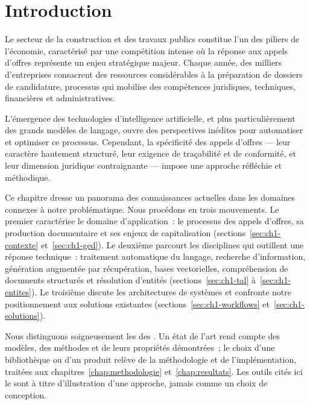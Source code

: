 \section{Introduction}
\label{sec:ch1-intro}

Le secteur de la construction et des travaux publics constitue l'un des piliers
de l'économie, caractérisé par une compétition intense où la réponse aux appels
d'offres représente un enjeu stratégique majeur. Chaque année, des milliers
d'entreprises consacrent des ressources considérables à la préparation de
dossiers de candidature, processus qui mobilise des compétences juridiques,
techniques, financières et administratives.

L'émergence des technologies d'intelligence artificielle, et plus
particulièrement des grands modèles de langage, ouvre des perspectives inédites
pour automatiser et optimiser ce processus. Cependant, la spécificité des appels
d'offres — leur caractère hautement structuré, leur exigence de traçabilité et
de conformité, et leur dimension juridique contraignante — impose une approche
réfléchie et méthodique.

Ce chapitre dresse un panorama des connaissances actuelles dans les domaines
connexes à notre problématique. Nous procédons en trois mouvements. Le premier
caractérise le domaine d'application~: le processus des appels d'offres, sa
production documentaire et ses enjeux de capitalisation
(sections~\ref{sec:ch1-contexte} et~\ref{sec:ch1-ged}). Le deuxième parcourt
les disciplines qui outillent une réponse technique~: traitement automatique du
langage, recherche d'information, génération augmentée par récupération, bases
vectorielles, compréhension de documents structurés et résolution d'entités
(sections~\ref{sec:ch1-tal} à~\ref{sec:ch1-entites}). Le troisième discute les
architectures de systèmes et confronte notre positionnement aux solutions
existantes (sections~\ref{sec:ch1-workflows} et~\ref{sec:ch1-solutions}).

\begin{btpnote}
Nous distinguons soigneusement les  des . Un
état de l'art rend compte des modèles, des méthodes et de leurs propriétés
démontrées~; le choix d'une bibliothèque ou d'un produit relève de la
méthodologie et de l'implémentation, traitées aux chapitres~\ref{chap:methodologie}
et~\ref{chap:resultats}. Les outils cités ici le sont à titre d'illustration
d'une approche, jamais comme un choix de conception.
\end{btpnote}
